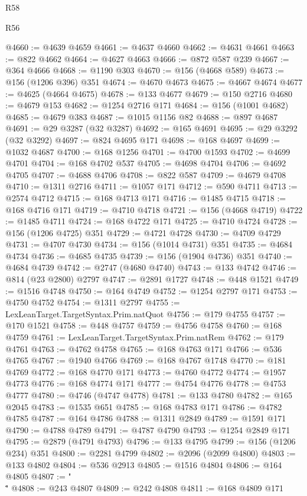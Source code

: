 \begin{lexlean}{R58}
\begin{lexlean}{R56}
\begin{coremodule}
{{{{{{{{{{{{{{{{{{{{{{{{{{{{{{{{{{{{{{{{{{{{{{{{{{{{{{{{{{{{{{{{{{{{{{{{{{{{{{{{{{{{{{{{{{{{{{{{{{{{{{{{{{{{{{{{{{{{{{{{{{{{{{{{{{{{{{{{{{{{{{{{{{{{{{{{{{{{{{{{{{{{{{{{{{{{{{{{{{{{{{{{{{{{{{{{{{{{{{{{{{{{{{{{{{{@4660 := @4639 @4659
@4661 := @4637 @4660
@4662 := @4631 @4661
@4663 := @822 @4662
@4664 := @4627 @4663
@4666 := @872 @587 @239
@4667 := @364 @4666
@4668 := @1190 @303
@4670 := @156 (@4668 @589)
@4673 := @156 (@1206 @396) @351
@4674 := @4670 @4673
@4675 := @4667 @4674
@4677 := @4625 (@4664 @4675)
@4678 := @133 @4677
@4679 := @150 @2716
@4680 := @4679 @153
@4682 := @1254 @2716 @171
@4684 := @156 (@1001 @4682)
@4685 := @4679 @383
@4687 := @1015 @1156 @82
@4688 := @897 @4687
@4691 := @29 @3287 (@32 @3287)
@4692 := @165 @4691
@4695 := @29 @3292 (@32 @3292)
@4697 := @824 @4695 @171
@4698 := @168 @4697
@4699 := @1032 @4687
@4700 := @168 @1256
@4701 := @4700 @1593
@4702 := @4699 @4701
@4704 := @168 @4702 @537
@4705 := @4698 @4704
@4706 := @4692 @4705
@4707 := @4688 @4706
@4708 := @822 @587
@4709 := @4679 @4708
@4710 := @1311 @2716
@4711 := @1057 @171
@4712 := @590 @4711
@4713 := @2574 @4712
@4715 := @168 @4713 @171
@4716 := @1485 @4715
@4718 := @168 @4716 @171
@4719 := @4710 @4718
@4721 := @156 (@4668 @4719)
@4722 := @1485 @4711
@4724 := @168 @4722 @171
@4725 := @4710 @4724
@4728 := @156 (@1206 @4725) @351
@4729 := @4721 @4728
@4730 := @4709 @4729
@4731 := @4707 @4730
@4734 := @156 (@1014 @4731) @351
@4735 := @4684 @4734
@4736 := @4685 @4735
@4739 := @156 (@1904 @4736) @351
@4740 := @4684 @4739
@4742 := @2747 (@4680 @4740)
@4743 := @133 @4742
@4746 := @814 (@23 @2800) @2797
@4747 := @2891 @1727
@4748 := @448 @1521
@4749 := @1516 @4748
@4750 := @164 @4749
@4752 := @1254 @2797 @171
@4753 := @4750 @4752
@4754 := @1311 @2797
@4755 := LexLeanTarget.TargetSyntax.Prim.natQuot
@4756 := @179 @4755
@4757 := @170 @1521
@4758 := @448 @4757
@4759 := @4756 @4758
@4760 := @168 @4759
@4761 := LexLeanTarget.TargetSyntax.Prim.natRem
@4762 := @179 @4761
@4763 := @4762 @4758
@4765 := @168 @4763 @171
@4766 := @536 @4765
@4767 := @1940 @4766
@4769 := @168 @4767 @1748
@4770 := @181 @4769
@4772 := @168 @4770 @171
@4773 := @4760 @4772
@4774 := @1957 @4773
@4776 := @168 @4774 @171
@4777 := @4754 @4776
@4778 := @4753 @4777
@4780 := @4746 (@4747 @4778)
@4781 := @133 @4780
@4782 := @165 @2045
@4783 := @1535 @651
@4785 := @168 @4783 @171
@4786 := @4782 @4785
@4787 := @164 @4786
@4788 := @1311 @2849
@4789 := @1591 @171
@4790 := @4788 @4789
@4791 := @4787 @4790
@4793 := @1254 @2849 @171
@4795 := @2879 (@4791 @4793)
@4796 := @133 @4795
@4799 := @156 (@1206 @234) @351
@4800 := @2281 @4799
@4802 := @2096 (@2099 @4800)
@4803 := @133 @4802
@4804 := @536 @2913
@4805 := @1516 @4804
@4806 := @164 @4805
@4807 := "\\\""
@4808 := @243 @4807
@4809 := @242 @4808
@4811 := @168 @4809 @171
}}}}}}}}}}}}}}}}}}}}}}}}}}}}}}}}}}}}}}}}}}}}}}}}}}}}}}}}}}}}}}}}}}}}}}}}}}}}}}}}}}}}}}}}}}}}}}}}}}}}}}}}}}}}}}}}}}}}}}}}}}}}}}}}}}}}}}}}}}}}}}}}}}}}}}}}}}}}}}}}}}}}}}}}}}}}}}}}}}}}}}}}}}}}}}}}}}}}}}}}}}}}}}}}}}}
\end{coremodule}
\end{lexlean}
\end{lexlean}
